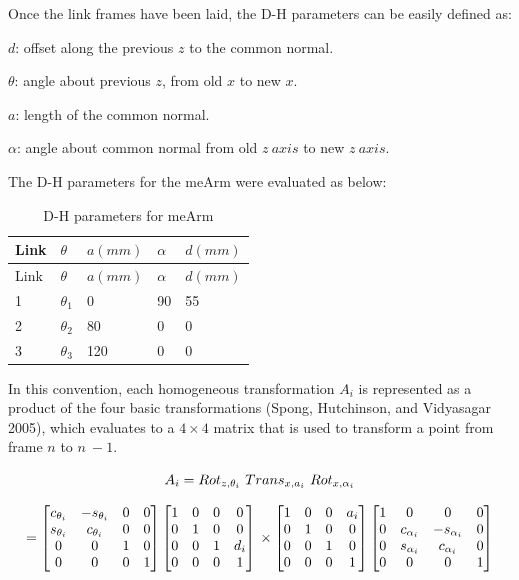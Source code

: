 \documentclass[
  letterpaper,
  DIV=11,
  numbers=noendperiod]{scrreprt}
\begin{document}
Once the link frames have been laid, the D-H parameters can be easily
defined as:

\(d\): offset along the previous \(z\) to the common normal.

\(\theta\): angle about previous \(z\), from old \(x\) to new \(x\).

\(a\): length of the common normal.

\(\alpha\): angle about common normal from old \(z\ axis\) to new
\(z\ axis\).

The D-H parameters for the meArm were evaluated as below:

\begin{longtable}[]{@{}lllll@{}}
\caption{D-H parameters for meArm}\tabularnewline
\toprule()
Link & \(\theta\) & \(a(mm)\) & \(\alpha\) & \(d(mm)\) \\
\midrule()
\endfirsthead
\toprule()
Link & \(\theta\) & \(a(mm)\) & \(\alpha\) & \(d(mm)\) \\
\midrule()
\endhead
1 & \(\theta_1\) & 0 & 90 & 55 \\
2 & \(\theta_2\) & 80 & 0 & 0 \\
3 & \(\theta_3\) & 120 & 0 & 0 \\
\bottomrule()
\end{longtable}

In this convention, each homogeneous transformation \(A_i\) is
represented as a product of the four basic transformations (Spong,
Hutchinson, and Vidyasagar 2005), which evaluates to a \(4\times4\)
matrix that is used to transform a point from frame \(n\) to \(n\ -1\).

\[
A_i = Rot_{z, \theta_i}\ Trans_{x, a_i}\ Rot_{x, \alpha_i} \\
\]

\[
= \begin{bmatrix}
c_{\theta_i} & -s_{\theta_i} & 0 & 0 \\
s_{\theta_i} & c_{\theta_i} & 0 & 0 \\
0 & 0 & 1 & 0 \\
0 & 0 & 0 & 1
\end{bmatrix} 
\begin{bmatrix}
1 & 0 & 0 & 0 \\
0 & 1 & 0 & 0 \\
0 & 0 & 1 & d_i \\
0 & 0 & 0 & 1
\end{bmatrix}\\
\times \begin{bmatrix}
1 & 0 & 0 & a_i \\
0 & 1 & 0 & 0 \\
0 & 0 & 1 & 0 \\
0 & 0 & 0 & 1
\end{bmatrix}
\begin{bmatrix}
1 & 0 & 0 & 0 \\
0 & c_{\alpha_i} & -s_{\alpha_i} & 0 \\
0 & s_{\alpha_i} & c_{\alpha_i} & 0 \\
0 & 0 & 0 & 1
\end{bmatrix}
\]
\end{document}
